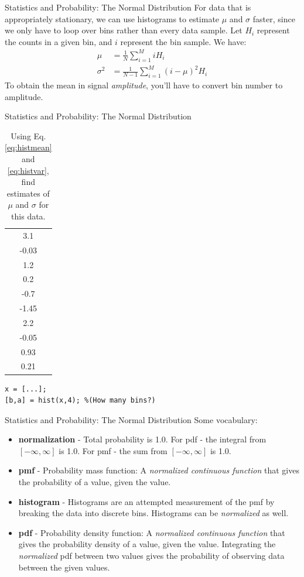 \documentclass{beamer}
\begin{document}
\begin{frame}[fragile]{Statistics and Probability: The Normal Distribution}
\small
For data that is appropriately stationary, we can use histograms to estimate $\mu$ and $\sigma$ faster, since we only have to loop over bins rather than every data sample.  Let $H_i$ represent the counts in a given bin, and $i$ represent the bin sample.  We have:
\begin{align}
\mu &= \frac{1}{N}\sum_{i=1}^{M}i H_i \label{eq:histmean} \\
\sigma^{2} &= \frac{1}{N-1}\sum_{i=1}^M \left(i-\mu\right)^2 H_i \label{eq:histvar}
\end{align}
To obtain the mean in signal \textit{amplitude}, you'll have to convert bin number to amplitude.
\end{frame}

\begin{frame}[fragile]{Statistics and Probability: The Normal Distribution}
\small
\begin{table}
\begin{tabular}{c}
3.1 \\
-0.03 \\
1.2 \\
0.2 \\
-0.7 \\
-1.45 \\
2.2 \\
-0.05 \\
0.93 \\
0.21 
\end{tabular}
\caption{\label{tab:hist} Using Eq. \ref{eq:histmean} and \ref{eq:histvar}, find estimates of $\mu$ and $\sigma$ for this data.}
\end{table}
\begin{verbatim}
x = [...];
[b,a] = hist(x,4); %(How many bins?)
\end{verbatim}
\end{frame}

\begin{frame}[fragile]{Statistics and Probability: The Normal Distribution}
\small
Some vocabulary:
\begin{itemize}
\item \textbf{normalization} - Total probability is 1.0.  For pdf - the integral from $[-\infty,\infty]$ is 1.0.  For pmf - the sum from $[-\infty,\infty]$ is 1.0.
\item \textbf{pmf} - Probability mass function: A \textit{normalized continuous function} that gives the probability of a value, given the value.
\item \textbf{histogram} - Histograms are an attempted measurement of the pmf by breaking the data into discrete bins.  Histograms can be \textit{normalized} as well.
\item \textbf{pdf} - Probability density function: A \textit{normalized continuous function} that gives the probability density of a value, given the value.  Integrating the \textit{normalized} pdf between two values gives the probability of observing data between the given values.
\end{itemize}
\end{frame}
\end{document}
